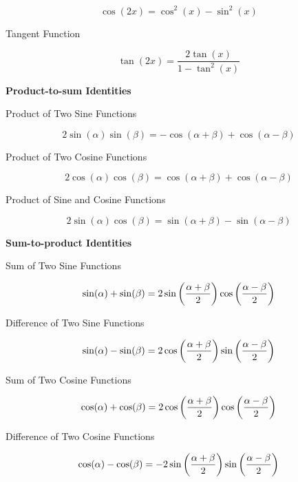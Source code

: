 \documentclass[a4paper,12pt]{article}
\begin{document}
\begin{pst}
\begin{alist}
\begin{rlist}
      $$\cos(2x)=\cos^{2}(x)-\sin^{2}(x)$$

      \item Tangent Function

      $$\tan(2x)=\frac{2\tan(x)}{1-\tan^{2}(x)}$$
    \end{rlist}

    \propdisp

    \item \textbf{Product-to-sum Identities}

    \begin{rlist}
      \item Product of Two Sine Functions

      $$2\sin(\alpha)\sin(\beta)=-\cos(\alpha+\beta)+\cos(\alpha-\beta)$$

      \item Product of Two Cosine Functions

      $$2\cos(\alpha)\cos(\beta)=\cos(\alpha+\beta)+\cos(\alpha-\beta)$$

      \item Product of Sine and Cosine Functions

      $$2\sin(\alpha)\cos(\beta)=\sin(\alpha+\beta)-\sin(\alpha-\beta)$$
    \end{rlist}

    \item \textbf{Sum-to-product Identities}

    \begin{rlist}
      \item Sum of Two Sine Functions

      $$\sin(\alpha)+\sin(\beta)=2\sin\left( \frac{\alpha+\beta}{2}\right)\cos\left( \frac{\alpha-\beta}{2}\right)$$

      \item Difference of Two Sine Functions

      $$\sin(\alpha)-\sin(\beta)=2\cos\left( \frac{\alpha+\beta}{2}\right)\sin\left( \frac{\alpha-\beta}{2}\right)$$

      \item Sum of Two Cosine Functions

      $$\cos(\alpha)+\cos(\beta)=2\cos\left( \frac{\alpha+\beta}{2}\right)\cos\left( \frac{\alpha-\beta}{2}\right)$$

      \item Difference of Two Cosine Functions

      $$\cos(\alpha)-\cos(\beta)=-2\sin\left( \frac{\alpha+\beta}{2}\right)\sin\left( \frac{\alpha-\beta}{2}\right)$$
    \end{rlist}
  \end{alist}
\end{pst}
\end{document}
